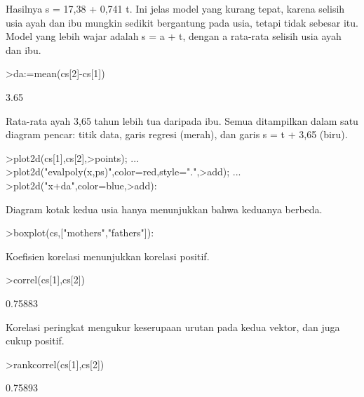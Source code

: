 \documentclass[a4paper,10pt]{article}
\begin{document}
\begin{eulernotebook}
\begin{eulercomment}
\begin{eulercomment}
\begin{eulercomment}
\begin{eulercomment}
\begin{eulercomment}
\begin{eulercomment}
\begin{eulercomment}
\begin{eulercomment}
\begin{eulercomment}
\begin{eulercomment}
\begin{eulercomment}
\begin{eulercomment}
\begin{eulercomment}
\begin{eulercomment}
\begin{eulercomment}
\begin{eulercomment}
\begin{eulerprompt}
\end{eulerprompt}
\begin{euleroutput}
  [17.379,  0.74096]
\end{euleroutput}
\begin{eulercomment}
Hasilnya s = 17,38 + 0,741 t. Ini jelas model yang kurang tepat, karena selisih usia ayah
dan ibu mungkin sedikit bergantung pada usia, tetapi tidak sebesar itu. Model yang lebih
wajar adalah s = a + t, dengan a rata-rata selisih usia ayah dan ibu.
\end{eulercomment}
\begin{eulerprompt}
>da:=mean(cs[2]-cs[1])
\end{eulerprompt}
\begin{euleroutput}
  3.65
\end{euleroutput}
\begin{eulercomment}
Rata-rata ayah 3,65 tahun lebih tua daripada ibu. Semua ditampilkan dalam satu diagram
pencar: titik data, garis regresi (merah), dan garis s = t + 3,65 (biru).
\end{eulercomment}
\begin{eulerprompt}
>plot2d(cs[1],cs[2],>points);  ...
>plot2d("evalpoly(x,ps)",color=red,style=".",>add);  ...
>plot2d("x+da",color=blue,>add):
\end{eulerprompt}
\begin{eulercomment}
Diagram kotak kedua usia hanya menunjukkan bahwa keduanya berbeda.
\end{eulercomment}
\begin{eulerprompt}
>boxplot(cs,["mothers","fathers"]):
\end{eulerprompt}
\begin{eulercomment}
Koefisien korelasi menunjukkan korelasi positif.
\end{eulercomment}
\begin{eulerprompt}
>correl(cs[1],cs[2])
\end{eulerprompt}
\begin{euleroutput}
  0.75883
\end{euleroutput}
\begin{eulercomment}
Korelasi peringkat mengukur keserupaan urutan pada kedua vektor, dan juga cukup positif.
\end{eulercomment}
\begin{eulerprompt}
>rankcorrel(cs[1],cs[2])
\end{eulerprompt}
\begin{euleroutput}
  0.75893
\end{euleroutput}

\end{eulercomment}
\end{eulercomment}
\end{eulercomment}
\end{eulercomment}
\end{eulercomment}
\end{eulercomment}
\end{eulercomment}
\end{eulercomment}
\end{eulercomment}
\end{eulercomment}
\end{eulercomment}
\end{eulercomment}
\end{eulercomment}
\end{eulercomment}
\end{eulercomment}
\end{eulercomment}
\end{eulernotebook}
\end{document}
